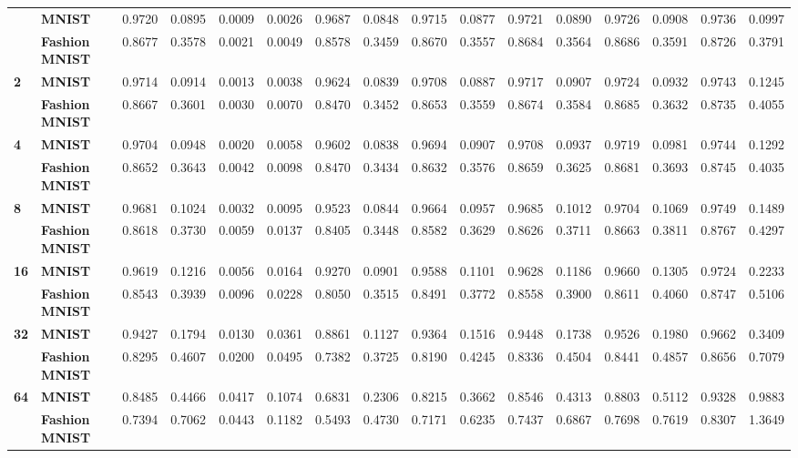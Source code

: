 \begin{longtable}{llrrrrrrrrrrrrrr}
\bottomrule
\endlastfoot
\multirow{2}{*}{\textbf{1 }} & \textbf{MNIST} &   0.9720 &  0.0895 &   0.0009 &  0.0026 &   0.9687 &  0.0848 &   0.9715 &  0.0877 &   0.9721 &  0.0890 &   0.9726 &  0.0908 &   0.9736 &  0.0997 \\
   & \textbf{Fashion MNIST} &   0.8677 &  0.3578 &   0.0021 &  0.0049 &   0.8578 &  0.3459 &   0.8670 &  0.3557 &   0.8684 &  0.3564 &   0.8686 &  0.3591 &   0.8726 &  0.3791 \\
\cline{1-16}
\multirow{2}{*}{\textbf{2 }} & \textbf{MNIST} &   0.9714 &  0.0914 &   0.0013 &  0.0038 &   0.9624 &  0.0839 &   0.9708 &  0.0887 &   0.9717 &  0.0907 &   0.9724 &  0.0932 &   0.9743 &  0.1245 \\
   & \textbf{Fashion MNIST} &   0.8667 &  0.3601 &   0.0030 &  0.0070 &   0.8470 &  0.3452 &   0.8653 &  0.3559 &   0.8674 &  0.3584 &   0.8685 &  0.3632 &   0.8735 &  0.4055 \\
\cline{1-16}
\multirow{2}{*}{\textbf{4 }} & \textbf{MNIST} &   0.9704 &  0.0948 &   0.0020 &  0.0058 &   0.9602 &  0.0838 &   0.9694 &  0.0907 &   0.9708 &  0.0937 &   0.9719 &  0.0981 &   0.9744 &  0.1292 \\
   & \textbf{Fashion MNIST} &   0.8652 &  0.3643 &   0.0042 &  0.0098 &   0.8470 &  0.3434 &   0.8632 &  0.3576 &   0.8659 &  0.3625 &   0.8681 &  0.3693 &   0.8745 &  0.4035 \\
\cline{1-16}
\multirow{2}{*}{\textbf{8 }} & \textbf{MNIST} &   0.9681 &  0.1024 &   0.0032 &  0.0095 &   0.9523 &  0.0844 &   0.9664 &  0.0957 &   0.9685 &  0.1012 &   0.9704 &  0.1069 &   0.9749 &  0.1489 \\
   & \textbf{Fashion MNIST} &   0.8618 &  0.3730 &   0.0059 &  0.0137 &   0.8405 &  0.3448 &   0.8582 &  0.3629 &   0.8626 &  0.3711 &   0.8663 &  0.3811 &   0.8767 &  0.4297 \\
\cline{1-16}
\multirow{2}{*}{\textbf{16}} & \textbf{MNIST} &   0.9619 &  0.1216 &   0.0056 &  0.0164 &   0.9270 &  0.0901 &   0.9588 &  0.1101 &   0.9628 &  0.1186 &   0.9660 &  0.1305 &   0.9724 &  0.2233 \\
   & \textbf{Fashion MNIST} &   0.8543 &  0.3939 &   0.0096 &  0.0228 &   0.8050 &  0.3515 &   0.8491 &  0.3772 &   0.8558 &  0.3900 &   0.8611 &  0.4060 &   0.8747 &  0.5106 \\
\cline{1-16}
\multirow{2}{*}{\textbf{32}} & \textbf{MNIST} &   0.9427 &  0.1794 &   0.0130 &  0.0361 &   0.8861 &  0.1127 &   0.9364 &  0.1516 &   0.9448 &  0.1738 &   0.9526 &  0.1980 &   0.9662 &  0.3409 \\
   & \textbf{Fashion MNIST} &   0.8295 &  0.4607 &   0.0200 &  0.0495 &   0.7382 &  0.3725 &   0.8190 &  0.4245 &   0.8336 &  0.4504 &   0.8441 &  0.4857 &   0.8656 &  0.7079 \\
\cline{1-16}
\multirow{2}{*}{\textbf{64}} & \textbf{MNIST} &   0.8485 &  0.4466 &   0.0417 &  0.1074 &   0.6831 &  0.2306 &   0.8215 &  0.3662 &   0.8546 &  0.4313 &   0.8803 &  0.5112 &   0.9328 &  0.9883 \\
   & \textbf{Fashion MNIST} &   0.7394 &  0.7062 &   0.0443 &  0.1182 &   0.5493 &  0.4730 &   0.7171 &  0.6235 &   0.7437 &  0.6867 &   0.7698 &  0.7619 &   0.8307 &  1.3649 \\
\end{longtable}
